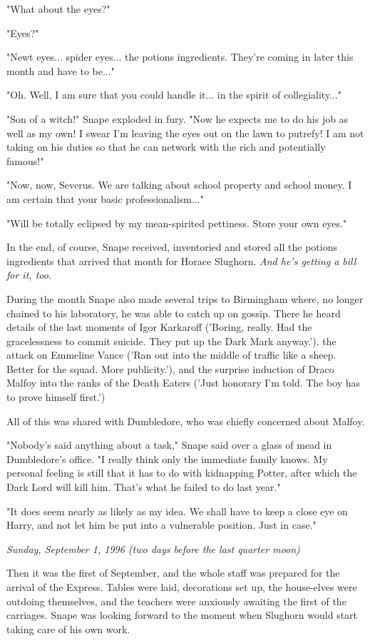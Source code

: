 \documentclass[a4paper,11pt]{article}
\begin{document}
"What about the eyes?"

"Eyes?"

"Newt eyes... spider eyes... the potions ingredients. They're coming in later this month and have to be..."

"Oh. Well, I am sure that you could handle it... in the spirit of collegiality..."

"Son of a witch!" Snape exploded in fury. "Now he expects me to do his job as well as my own! I swear I'm leaving the eyes out on the lawn to putrefy! I am not taking on his duties so that he can network with the rich and potentially famous!"

"Now, now, Severus. We are talking about school property and school money. I am certain that your basic professionalism..."

"Will be totally eclipsed by my mean-spirited pettiness. Store your own eyes."

In the end, of course, Snape received, inventoried and stored all the potions ingredients that arrived that month for Horace Slughorn. \emph{And he's getting a bill for it, too.}

During the month Snape also made several trips to Birmingham where, no longer chained to his laboratory, he was able to catch up on gossip. There he heard details of the last moments of Igor Karkaroff ('Boring, really. Had the gracelessness to commit suicide. They put up the Dark Mark anyway.'), the attack on Emmeline Vance ('Ran out into the middle of traffic like a sheep. Better for the squad. More publicity.'), and the surprise induction of Draco Malfoy into the ranks of the Death Eaters ('Just honorary I'm told. The boy has to prove himself first.')

All of this was shared with Dumbledore, who was chiefly concerned about Malfoy.

"Nobody's said anything about a task," Snape said over a glass of mead in Dumbledore's office. "I really think only the immediate family knows. My personal feeling is still that it has to do with kidnapping Potter, after which the Dark Lord will kill him. That's what he failed to do last year."

"It does seem nearly as likely as my idea. We shall have to keep a close eye on Harry, and not let him be put into a vulnerable position. Just in case."

\emph{Sunday, September 1, 1996 (two days before the last quarter moon)}

Then it was the first of September, and the whole staff was prepared for the arrival of the Express. Tables were laid, decorations set up, the house-elves were outdoing themselves, and the teachers were anxiously awaiting the first of the carriages. Snape was looking forward to the moment when Slughorn would start taking care of his own work.
\end{document}
